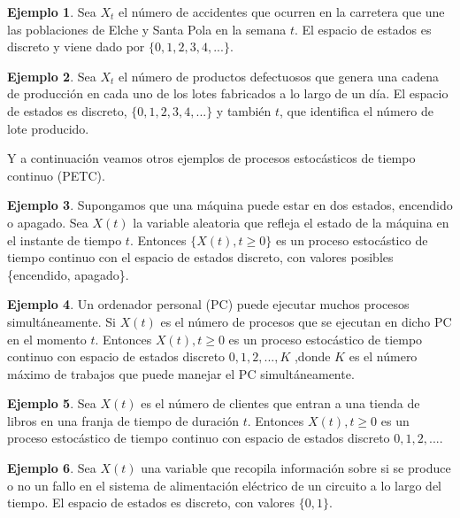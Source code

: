 \documentclass[
]{book}
\theoremstyle{definition}
\theoremstyle{definition}
\newtheorem{example}{Ejemplo}[chapter]
\theoremstyle{definition}
\theoremstyle{definition}
\theoremstyle{remark}
\begin{document}
\begin{example}
\protect\hypertarget{exm:petd5}{}\label{exm:petd5}Sea \(X_t\) el número de accidentes que ocurren en la carretera que une las poblaciones de Elche y Santa Pola en la semana \(t\). El espacio de estados es discreto y viene dado por \(\{0, 1, 2, 3, 4,...\}\).
\end{example}

\begin{example}
\protect\hypertarget{exm:petd6}{}\label{exm:petd6}Sea \(X_t\) el número de productos defectuosos que genera una cadena de producción en cada uno de los lotes fabricados a lo largo de un día. El espacio de estados es discreto, \(\{0, 1, 2, 3, 4,...\}\) y también \(t\), que identifica el número de lote producido.
\end{example}

Y a continuación veamos otros ejemplos de procesos estocásticos de tiempo continuo (PETC).

\begin{example}
\protect\hypertarget{exm:petc1}{}\label{exm:petc1}Supongamos que una máquina puede estar en dos estados, encendido o apagado. Sea \(X(t)\) la variable aleatoria que refleja el estado de la máquina en el instante de tiempo \(t\). Entonces \(\{X(t), t \geq 0\}\) es un proceso estocástico de tiempo continuo con el espacio de estados discreto, con valores posibles \{encendido, apagado\}.
\end{example}

\begin{example}
\protect\hypertarget{exm:petc2}{}\label{exm:petc2}Un ordenador personal (PC) puede ejecutar muchos procesos simultáneamente. Si \(X(t)\) es el número de procesos que se ejecutan en dicho PC en el momento \(t\). Entonces \(X(t), t \geq 0\) es un proceso estocástico de tiempo continuo con espacio de estados discreto \(0, 1, 2,...,K\) ,donde \(K\) es el número máximo de trabajos que puede manejar el PC simultáneamente.
\end{example}

\begin{example}
\protect\hypertarget{exm:petc3}{}\label{exm:petc3}Sea \(X(t)\) es el número de clientes que entran a una tienda de libros en una franja de tiempo de duración \(t\). Entonces \(X(t), t \geq 0\) es un proceso estocástico de tiempo continuo con espacio de estados discreto \(0, 1, 2,...\).
\end{example}

\begin{example}
\protect\hypertarget{exm:petc4}{}\label{exm:petc4}Sea \(X(t)\) una variable que recopila información sobre si se produce o no un fallo en el sistema de alimentación eléctrico de un circuito a lo largo del tiempo. El espacio de estados es discreto, con valores \(\{0,1\}\).
\end{example}
\end{document}
